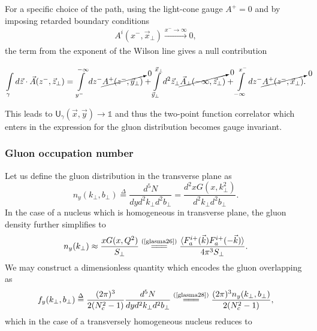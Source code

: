 For a specific choice of the path, using the light-cone gauge $A^+=0$ and by imposing retarded boundary conditions 
\begin{align*}
    A^i(x^-,\vec{x}_\perp)\xrightarrow[]{x^-\rightarrow\infty}0,
\end{align*}
the term from the exponent of the Wilson line gives a null contribution
\begin{fullwidth}
\begin{equation*}
    \int\limits_{\gamma}d \vec{z} \cdot \vec{A}(z^-,\vec{z}_\perp)=\int\limits_{y^-}^{-\infty}dz^-\cancelto{0}{A^+(z^-,\vec{y}_\perp)}+\int\limits_{\vec{y}_\perp}^{\vec{x}_\perp}d^2\vec{z}_\perp\cancelto{0}{\vec{A}_\perp(-\infty,\vec{z}_\perp)}+\int\limits_{-\infty}^{x^-}dz^-\cancelto{0}{A^+(z^-,\vec{x}_\perp)}.
\end{equation*}
\end{fullwidth}
This leads to $\textsf{U}_{\gamma}(\vec{x}, \vec{y})\rightarrow \mathds{1}$ and thus the two-point function correlator which enters in the expression for the gluon distribution becomes gauge invariant.


\subsubsection*{Gluon occupation number}
Let us define the gluon distribution in the transverse plane as
\begin{equation}\label{glasma28}
    n_y(k_\perp,b_\perp)\overset{\Delta}{=}\frac{d^5N}{dyd^2k_\perp d^2b_\perp}=\frac{d^2xG(x,k_\perp^2)}{d^2k_\perp d^2b_\perp}.
\end{equation}
In the case of a nucleus which is homogeneous in transverse plane, the gluon density further simplifies to
\begin{align}\label{glasma27}
    n_y(k_\perp)\approx\frac{xG(x,Q^2)}{S_\perp}\stackrel{(\text{\cref{glasma26}})}{=\joinrel=\joinrel=}\frac{\langle F_{a}^{i+}(\vec{k}) F_{a}^{i+}(-\vec{k})\rangle}{4\pi^3S_\perp}.
\end{align}
We may construct a dimensionless quantity which encodes the gluon overlapping as
\begin{align*}
    f_y(k_\perp,b_\perp)\overset{\Delta}{=}\frac{(2\pi)^3}{2(N_c^2-1)}\frac{d^5N}{dyd^2k_\perp d^2b_\perp}\stackrel{(\text{\cref{glasma28}})}{=\joinrel=\joinrel=}\frac{(2\pi)^3n_y(k_\perp,b_\perp)}{2(N_c^2-1)},
\end{align*}
which in the case of a transversely homogeneous nucleus reduces to

